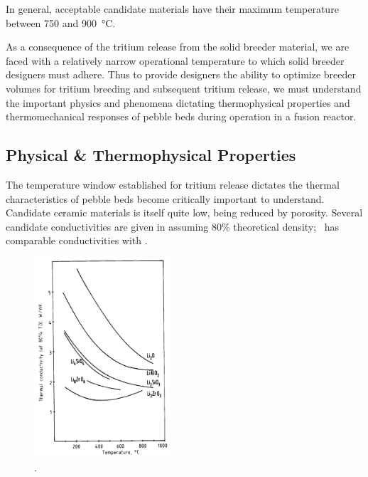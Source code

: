 \documentclass[11pt]{report} %
\newcommand{\lit}{\ce{Li2TiO3}}
\newcommand{\lis}{\ce{Li4SiO4}}
\begin{document}
In general, acceptable candidate materials have their maximum temperature between 750 and \SI{900}{\celsius}. 

As a consequence of the tritium release from the solid breeder material, we are faced with a relatively narrow operational temperature to which solid breeder designers must adhere. Thus to provide designers the ability to optimize breeder volumes for tritium breeding and subsequent tritium release, we must understand the important physics and phenomena dictating thermophysical properties and thermomechanical responses of pebble beds during operation in a fusion reactor.


\FloatBarrier
\subsection{Physical \& Thermophysical Properties}
The temperature window established for tritium release dictates the thermal characteristics of pebble beds become critically important to understand. Candidate ceramic materials is itself quite low, being reduced by porosity. Several candidate conductivities are given in  assuming 80\% theoretical density; \lit~has comparable conductivities with \lis.

\begin{figure}[ht]
	\centering
	\includegraphics[width=0.45\textwidth]{images/k_s} 
	\caption{.}
	\label{fig:k_s}
\end{figure}
\end{document}
